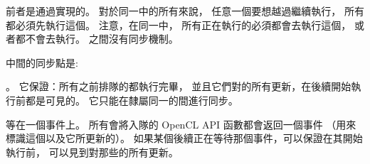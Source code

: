 前者是通過實現的。
對於同一中的所有來說，
任意一個要想越過繼續執行，
所有都必須先執行這個。
注意，在同一中，
所有正在執行的必須都會去執行這個，
或者都不會去執行。
之間沒有同步機制。

中間的同步點是:
\startigBase
\item {}。
它保證：所有之前排隊的都執行完畢，
並且它們對的所有更新，在後續開始執行前都是可見的。
它只能在隸屬同一的間進行同步。

\item 等在一個事件上。
所有會將入隊的 OpenCL API 函數都會返回一個事件
（用來標識這個以及它所更新的）。
如果某個後續正在等待那個事件，可以保證在其開始執行前，
可以見到對那些的所有更新。
\stopigBase

